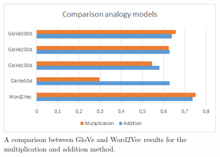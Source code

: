 \begin{figure}[H]
	\centering
	\includegraphics[width=130mm]{images/chart1.png}
	\caption{A comparison between GloVe and Word2Vec results for the multiplication and addition method.}
	\label{fig:gloveword2veccomparison}
\end{figure}